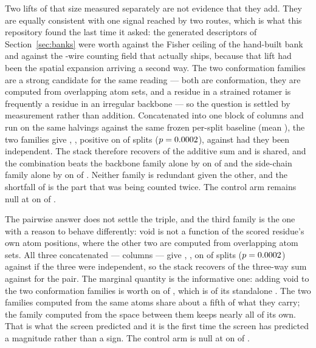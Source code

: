 \documentclass[11pt]{article}
\begin{document}
Two lifts of that size measured separately are not evidence that they add. They
are equally consistent with one signal reached by two routes, which is what this
repository found the last time it asked: the generated descriptors of
Section~\ref{sec:banks} were worth \GenCeilLift{} against the Fisher
ceiling of the hand-built bank and \GenWireDelta{} against the
\GenWiresBase{}-wire counting field that actually ships, because that lift had
been the spatial expansion arriving a second way. The two conformation families are a
strong candidate for the same reading --- both are conformation, they are
computed from overlapping atom sets, and a residue in a strained rotamer is
frequently a residue in an irregular backbone --- so the question is settled by
measurement rather than addition. Concatenated into one block of
\FamConfCols{} columns and run on the same \FamAddOf{} halvings against the same
frozen per-split baseline (mean \FamAddNarrow{}), the two families give
\FamConf{}, \FamConfCI{}, positive on \FamConfSplits{} of \FamConfOf{} splits
(\(p=0.0002{}\)), against \FamAddSum{} had they been independent. The stack
therefore recovers \FamAddRecovered{} of the additive sum and \FamAddShared{} is
shared, and the combination beats the backbone family alone by \FamAddOverBkb{}
on \FamAddOverBkbSplits{} of \FamAddOf{} and the side-chain family alone by
\FamAddOverSide{} on \FamAddOverSideSplits{} of \FamAddOf{}. Neither family is
redundant given the other, and the shortfall of \FamAddShortfall{} is the part
that was being counted twice. The control arm remains null at
\FamConfControl{} on \FamConfControlSplits{} of \FamConfOf{}.

The pairwise answer does not settle the triple, and the third family is the one
with a reason to behave differently: void is not a function of the scored
residue's own atom positions, where the other two are computed from overlapping
atom sets. All three concatenated --- \FamGeomCols{} columns --- give
\FamGeom{}, \FamGeomCI{}, on \FamGeomSplits{} of \FamGeomOf{} splits
(\(p=0.0002{}\)) against \FamAddSumThree{} if the three were independent, so
the stack recovers \FamAddRecoveredThree{} of the three-way sum against
\FamAddRecovered{} for the pair. The marginal quantity is the informative one:
adding void to the two conformation families is worth \FamAddOverConf{} on
\FamAddOverConfSplits{} of \FamAddOf{}, which is \FamAddVoidKept{} of its
standalone \FamVoid{}. The two families computed from the same atoms share about
a fifth of what they carry; the family computed from the space between them
keeps nearly all of its own. That is what the screen predicted and it is the
first time the screen has predicted a magnitude rather than a sign. The control
arm is null at \FamGeomControl{} on \FamGeomControlSplits{} of \FamGeomOf{}.
\end{document}
